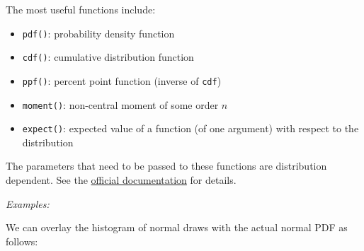 \documentclass[10pt]{scrartcl}
\providecommand{\tightlist}{%
      \setlength{\itemsep}{0pt}\setlength{\parskip}{0pt}}
\begin{document}
The most useful functions include:

\begin{itemize}
\tightlist
\item
  \texttt{pdf()}: probability density function
\item
  \texttt{cdf()}: cumulative distribution function
\item
  \texttt{ppf()}: percent point function (inverse of \texttt{cdf})
\item
  \texttt{moment()}: non-central moment of some order \(n\)
\item
  \texttt{expect()}: expected value of a function (of one argument) with
  respect to the distribution
\end{itemize}

The parameters that need to be passed to these functions are
distribution dependent. See the
\href{https://docs.scipy.org/doc/scipy/reference/stats.html}{official
documentation} for details.

\emph{Examples:}

We can overlay the histogram of normal draws with the actual normal PDF
as follows:
\end{document}

